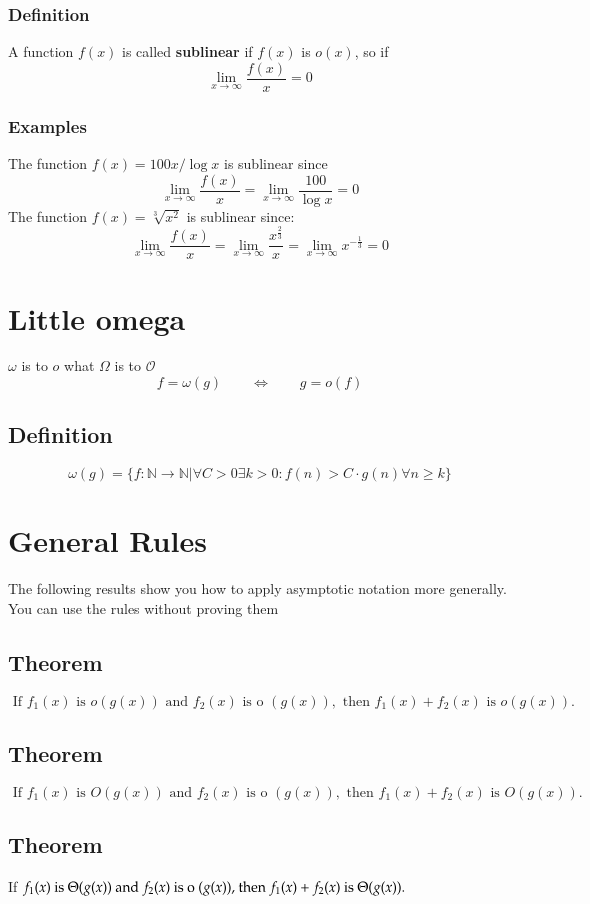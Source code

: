 \documentclass{article}[18pt]
\begin{document}
\subsubsection{Definition}
A function $f(x)$ is called \textbf{sublinear} if $f(x)$ is $o(x)$, so if
$$\lim_{x\to\infty}\dfrac{f(x)}{x}=0$$
\subsubsection{Examples}
The function $f(x)=100x/\log x$ is sublinear since
$$\lim_{x\to\infty}\dfrac{f(x)}{x}=\lim_{x\to\infty}\dfrac{100}{\log x}=0$$
The function $f(x)=\sqrt[3]{x^2}$ is sublinear since:
$$\lim_{x\to\infty}\dfrac{f(x)}{x}=\lim_{x\to\infty}\dfrac{x^{\frac{2}{3}}}{x}=\lim_{x\to\infty}x^{-\frac{1}{3}}=0$$
\section{Little omega}
$\omega$ is to $o$ what $\Omega$ is to $\mathcal{O}$
$$f=\omega(g) \qquad \Leftrightarrow \qquad g=o(f)$$
\subsection{Definition}
$$\omega ( g ) = \{ f : \mathbb { N } \rightarrow \mathbb { N } | \forall C > 0 \exists k > 0 : f ( n ) > C \cdot g ( n ) \forall n \geq k \}$$
\section{General Rules}
The following results show you how to apply asymptotic notation more generally. You can use the rules without proving them
\subsection{Theorem}
$$ \text { If } f _ { 1 } ( x ) \text { is } o ( g ( x ) ) \text { and } f _ { 2 } ( x ) \text { is o } ( g ( x ) ) , \text { then } f _ { 1 } ( x ) + f _ { 2 } ( x ) \text { is }  { o ( g ( x ) ) . }$$
\subsection{Theorem}
$$ { \text { If } f _ { 1 } ( x ) \text { is } O ( g ( x ) ) \text { and } f _ { 2 } ( x ) \text { is o } ( g ( x ) ) , \text { then } f _ { 1 } ( x ) + f _ { 2 } ( x ) \text { is } } { O ( g ( x ) ) . } $$
\subsection{Theorem}
\begin{center}
If $f _ { 1 } ( x ) \) is \( \Theta ( g ( x ) ) \) and \( f _ { 2 } ( x ) \) is o \( ( g ( x ) ) , \) then \( f _ { 1 } ( x ) + f _ { 2 } ( x ) \) is
\( \Theta ( g ( x ) ) .$
\end{center}
\end{document}
